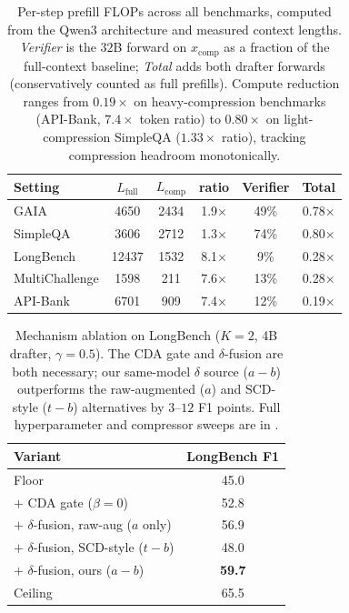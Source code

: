\documentclass[11pt]{article}
\theoremstyle{plain}
\theoremstyle{definition}
\begin{document}
\begin{table}[!h]
\centering
\footnotesize
\setlength{\tabcolsep}{4pt}
\begin{tabular}{lccccc}
\toprule
Setting & $L_{\text{full}}$ & $L_{\text{comp}}$ & ratio & Verifier & Total \\
\midrule
GAIA           & 4650  & 2434 & 1.9$\times$ & 49\% & 0.78$\times$ \\
SimpleQA       & 3606  & 2712 & 1.3$\times$ & 74\% & 0.80$\times$ \\
LongBench      & 12437 & 1532 & 8.1$\times$ & 9\%  & 0.28$\times$ \\
MultiChallenge & 1598  & 211  & 7.6$\times$ & 13\% & 0.28$\times$ \\
API-Bank       & 6701  & 909  & 7.4$\times$ & 12\% & 0.19$\times$ \\
\bottomrule
\end{tabular}
\caption{Per-step prefill FLOPs across all benchmarks, computed from the Qwen3 architecture and measured context lengths. \emph{Verifier} is the $32$B forward on $x_{\text{comp}}$ as a fraction of the full-context baseline; \emph{Total} adds both drafter forwards (conservatively counted as full prefills). Compute reduction ranges from $0.19\times$ on heavy-compression benchmarks (API-Bank, $7.4\times$ token ratio) to $0.80\times$ on light-compression SimpleQA ($1.33\times$ ratio), tracking compression headroom monotonically.}
\label{tab:flops}
\end{table}

\begin{table}[!h]
\centering
\footnotesize
\setlength{\tabcolsep}{8pt}
\begin{tabular}{l c}
\toprule
Variant & LongBench F1 \\
\midrule
Floor                                       & 45.0 \\
$+$ CDA gate ($\beta{=}0$)                  & 52.8 \\
$+$ $\delta$-fusion, raw-aug ($a$ only)     & 56.9 \\
$+$ $\delta$-fusion, SCD-style ($t-b$)      & 48.0 \\
$+$ $\delta$-fusion, ours ($a-b$)           & \textbf{59.7} \\
Ceiling                                     & 65.5 \\
\bottomrule
\end{tabular}
\caption{Mechanism ablation on LongBench ($K{=}2$, 4B drafter, $\gamma{=}0.5$). The CDA gate and $\delta$-fusion are both necessary; our same-model $\delta$ source ($a-b$) outperforms the raw-augmented ($a$) and SCD-style ($t-b$) alternatives by $3$--$12$ F1 points. Full hyperparameter and compressor sweeps are in .}
\label{tab:ablations}
\end{table}
\end{document}
